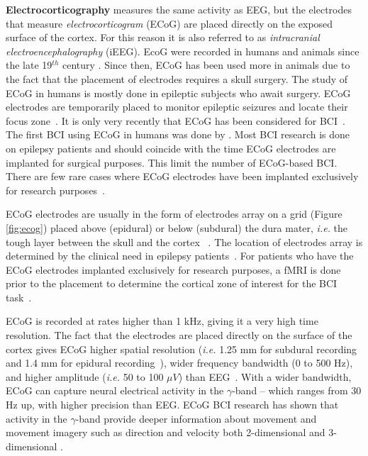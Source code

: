 \textbf{Electrocorticography} measures the same activity as EEG, but the electrodes that measure \emph{electrocorticogram} (ECoG) are placed directly on the exposed  surface of the cortex.  
For this reason it is also referred to as \emph{intracranial electroencephalography} (iEEG).
EcoG were recorded in humans and animals since the late 19$^{th}$ century \citep{caton_electrical_1875}.
Since then, ECoG has been used more in animals due to the fact that the placement of electrodes requires a skull surgery.
The study of ECoG in humans is mostly done in epileptic subjects who await surgery. 
ECoG electrodes are temporarily placed to monitor epileptic seizures and locate their focus zone~\citep{ritaccio_proceedings_2012}.
It is only very recently that ECoG has been considered for BCI~\citep{huggins_detection_1999, pfurtscheller_spatiotemporal_2003}. 
The first BCI using ECoG in humans was done by \cite{leuthardt_brain-computer_2004}.
Most BCI research is done on epilepsy patients and should coincide with the time ECoG electrodes are implanted for surgical purposes. This limit the number of ECoG-based BCI. 
There are few rare cases where ECoG electrodes have been implanted exclusively for research purposes~\citep{wang_electrocorticographic_2013, sutter_brain_1992}.

ECoG electrodes are usually in the form of electrodes array on a grid (Figure \ref{fig:ecog}) placed above (epidural) or below (subdural) the dura mater, \textit{i.e.} the tough layer between the skull and the cortex ~\citep{schalk_brain-computer_2011}.
The location of electrodes array is determined by the clinical need in epilepsy patients~\citep{bundy_decoding_2016}. 
For patients who have the ECoG electrodes implanted exclusively for research purposes, a fMRI is done prior to the placement to determine the cortical zone of interest for the BCI task~\citep{wang_electrocorticographic_2013}.   

ECoG is recorded at rates higher than 1 kHz, giving it a very high time resolution. 
The fact that the electrodes are placed directly on the surface of the cortex gives ECoG higher spatial resolution (\textit{i.e.} 1.25 mm for subdural recording and 1.4 mm for epidural recording~\citep{schalk_brain-computer_2011}), wider frequency bandwidth (0 to 500 Hz), and higher amplitude (\textit{i.e.} 50 to 100 $\mu V$) than EEG~\citep{schalk_brain-computer_2011, leuthardt_brain-computer_2004, spuler_decoding_2014}.
With a wider bandwidth, ECoG can capture neural electrical activity in the $\gamma$-band -- which ranges from 30 Hz up, with higher precision than EEG. 
ECoG BCI research has shown that activity in the $\gamma$-band provide deeper information about movement and movement imagery such as direction and velocity both 2-dimensional and 3-dimensional \citep{bundy_decoding_2016, leuthardt_brain-computer_2004}.

